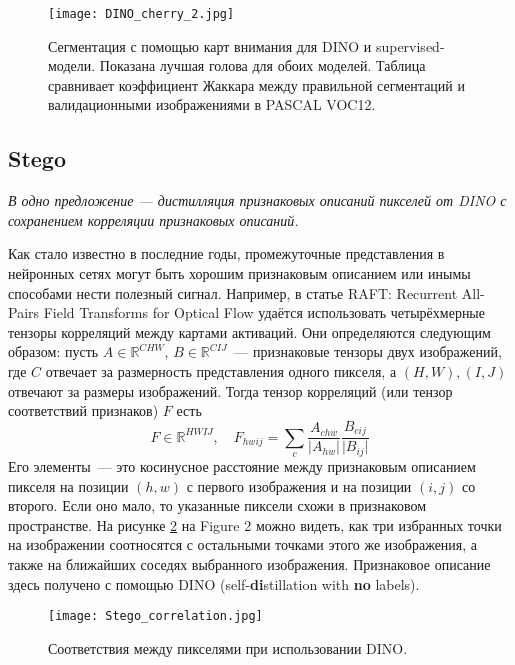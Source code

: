    \begin{figure}
        \centering
        \texttt{[image: DINO\_cherry\_2.jpg]}
        \caption{Сегментация с помощью карт внимания для DINO и supervised-модели.
        Показана лучшая голова для обоих моделей.
        Таблица сравнивает коэффициент Жаккара между правильной сегментаций 
        и валидационными изображениями в PASCAL VOC12.
        \label{fig:dino_cherry_2}}
    \end{figure}

    \FloatBarrier

\subsection{Stego}
    \textit{В одно предложение --- дистилляция признаковых описаний пикселей от DINO с сохранением корреляции признаковых описаний.}
    \bigskip

    Как стало известно в последние годы, промежуточные представления в нейронных сетях могут быть хорошим признаковым описанием или инымы способами нести полезный сигнал.
    Например, в статье RAFT: Recurrent All-Pairs Field Transforms for Optical Flow удаётся использовать четырёхмерные тензоры корреляций между картами активаций.
    Они определяются следующим образом: пусть $A \in \mathbb{R}^{C H W}$, $B \in \mathbb{R}^{C I J}$~--- признаковые тензоры двух изображений,
    где $C$ отвечает за размерность представления одного пикселя, а $(H, W), (I, J)$ отвечают за размеры изображений.
    Тогда тензор корреляций (или тензор соответствий признаков) $F$ есть
    \begin{equation}
        F \in \mathbb{R}^{H W I J}, \quad F_{hwij} = \sum_{c} \frac{A_{chw}}{\vert A_{hw}\vert} \frac{B_{cij}}{\vert B_{ij}\vert}
    \end{equation}
    Его элементы~--- это косинусное расстояние между признаковым описанием пикселя на позиции $(h, w)$ с первого изображения и на позиции $(i, j)$ со второго. 
    Если оно мало, то указанные пиксели схожи в признаковом пространстве.
    На рисунке \ref{fig:stego_correlation} на Figure 2 можно видеть, как три избранных точки на изображении соотносятся с остальными точками этого же изображения, а также на ближайших соседях выбранного изображения. 
    Признаковое описание здесь получено с помощью DINO (self-\textbf{di}stillation with \textbf{no} labels).

    \begin{figure}
        \centering
        \texttt{[image: Stego\_correlation.jpg]}
        \caption{Соответствия между пикселями при использовании DINO.\label{fig:stego_correlation}}
    \end{figure}

